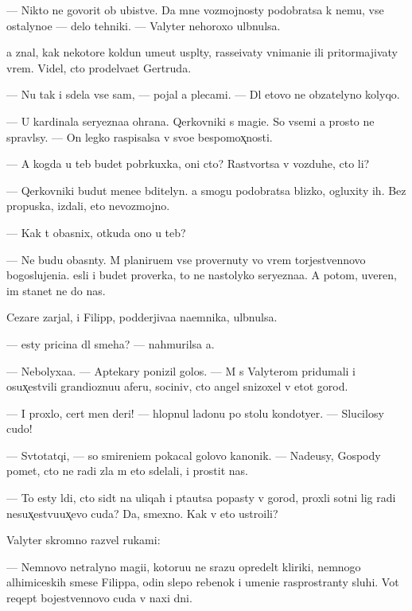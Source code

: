 \documentclass[10pt]{book}
\begin{document}
— Nikto ne govorit ob ubi{\y}stve. Da{\y} mne vozmojnosty podobratsa k nemu, vse ostalyno{\y}e — delo tehniki. — Valyter nehoroxo ul{\yi}bnulsa.

{\Y}a znal, kak nekotor{\yi}{\y}e koldun{\yi} ume{\y}ut us{\yi}pl{\ia}ty, rasse{\y}ivaty vnimani{\y}e ili pritormajivaty vrem{\ia}. Videl, cto prodel{\yi}va{\y}et Gertruda.

— Nu tak i sdela{\y} vse sam, — pojal {\y}a plecami. — Dl{\ia} etovo ne ob{\ia}zatelyno kolyqo.

— U kardinala seryezna{\y}a ohrana. Qerkovniki s magi{\y}e{\y}. So vsemi {\y}a prosto ne spravl{\iu}sy. — On legko raspisalsa v svo{\y}e{\y} bespomox̨nosti.

— A kogda u teb{\ia} budet pobr{\ia}kuxka, oni cto? Rastvor{\ia}tsa v vozduhe, cto li?

— Qerkovniki budut mene{\y}e bditelyn{\yi}. {\Y}a smogu podobratsa blizko, ogluxity ih. Bez propuska, izdali, eto nevozmojno.

— Kak t{\yi} ob{\y}asnix, otkuda ono u teb{\ia}?

— Ne budu ob{\y}asn{\ia}ty. M{\yi} planiru{\y}em vse provernuty vo vrem{\ia} torjestvennovo bogoslujeni{\y}a. {\Y}esli i budet proverka, to ne nastolyko seryezna{\y}a. A potom, uveren, im stanet ne do nas.

Cezare zarjal, i Filipp, podderjiva{\y}a na{\y}emnika, ul{\yi}bnulsa.

— {\Y}esty pricina dl{\ia} smeha? — nahmurilsa {\y}a.

— Nebolyxa{\y}a. — Aptekary ponizil golos. — M{\yi} s Valyterom pridumali i osux̨estvili grandioznu{\y}u aferu, sociniv, cto angel snizoxel v etot gorod.

— I proxlo, cert men{\ia} deri! — hlopnul ladon{\y}u po stolu kondotyer. — Slucilosy cudo!

— Sv{\ia}totatqi, — so smireni{\y}em pokacal golovo{\y} kanonik. — Nade{\y}usy, Gospody po{\y}met, cto ne radi zla m{\yi} eto sdelali, i prostit nas.

— To {\y}esty l{\iu}di, cto sid{\ia}t na uliqah i p{\yi}ta{\y}utsa popasty v gorod, proxli sotni lig radi nesux̨estvu{\y}ux̨evo cuda? Da, smexno. Kak v{\yi} eto ustro{\y}ili?

Valyter skromno razvel rukami:

— Nemnovo ne{\y}tralyno{\y} magi{\y}i, kotoru{\y}u ne srazu opredel{\ia}t kliriki, nemnogo alhimiceskih smese{\y} Filippa, odin slepo{\y} rebenok i umeni{\y}e rasprostran{\ia}ty sluhi. Vot reqept bojestvennovo cuda v naxi dni.
\end{document}
